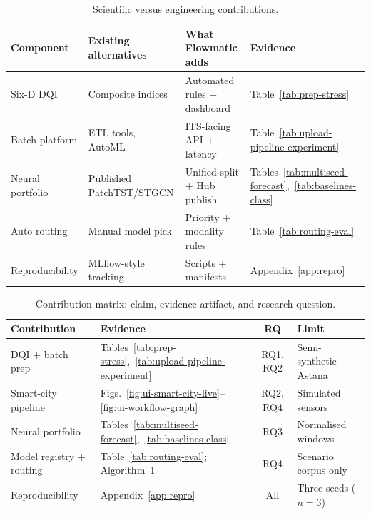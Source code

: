 \begin{table}[H]
  \centering
  \caption{Scientific versus engineering contributions.}
  \label{tab:sci-vs-eng}
  \small
  \begin{tabular}{@{}p{2.8cm}p{3.6cm}p{4.4cm}p{2.6cm}@{}}
    \toprule
    \textbf{Component} & \textbf{Existing alternatives} & \textbf{What Flowmatic adds} & \textbf{Evidence} \\
    \midrule
    Six-D DQI & Composite indices~\cite{pipino2002data} & Automated rules + dashboard & Table~\ref{tab:prep-stress} \\
    Batch platform & ETL tools, AutoML & ITS-facing API + latency & Table~\ref{tab:upload-pipeline-experiment} \\
    Neural portfolio & Published PatchTST/STGCN & Unified split + Hub publish & Tables~\ref{tab:multiseed-forecast},~\ref{tab:baselines-class} \\
    Auto routing & Manual model pick & Priority + modality rules & Table~\ref{tab:routing-eval} \\
    Reproducibility & MLflow-style tracking~\cite{zaharia2018accelerating} & Scripts + manifests & Appendix~\ref{app:repro} \\
    \bottomrule
  \end{tabular}
\end{table}

\begin{table}[H]
  \centering
  \caption{Contribution matrix: claim, evidence artifact, and research question.}
  \label{tab:contribution_matrix}
  \small
  \begin{tabular}{@{}p{2.8cm}p{4.0cm}cp{3.4cm}@{}}
    \toprule
    \textbf{Contribution} & \textbf{Evidence} & \textbf{RQ} & \textbf{Limit} \\
    \midrule
    DQI + batch prep & Tables~\ref{tab:prep-stress},~\ref{tab:upload-pipeline-experiment} & RQ1, RQ2 & Semi-synthetic Astana \\
    Smart-city pipeline & Figs.~\ref{fig:ui-smart-city-live}--\ref{fig:ui-workflow-graph} & RQ2, RQ4 & Simulated sensors \\
    Neural portfolio & Tables~\ref{tab:multiseed-forecast},~\ref{tab:baselines-class} & RQ3 & Normalised windows \\
    Model registry + routing & Table~\ref{tab:routing-eval}; Algorithm~1 & RQ4 & Scenario corpus only \\
    Reproducibility & Appendix~\ref{app:repro} & All & Three seeds ($n{=}3$) \\
    \bottomrule
  \end{tabular}
\end{table}

